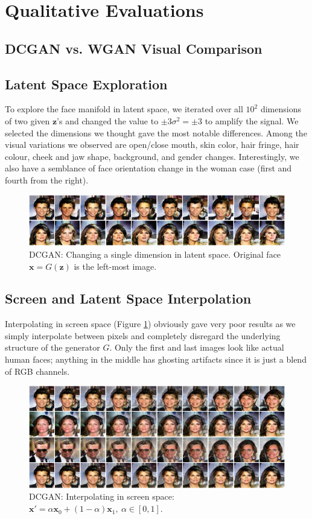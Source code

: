 \documentclass[table]{article}
\def\*#1{\mathbf{#1}}
\begin{document}
\newpage
\section{Qualitative Evaluations}
\subsection{DCGAN vs. WGAN Visual Comparison}


\subsection{Latent Space Exploration}
To explore the face manifold in latent space, we iterated over all $10^2$ dimensions of two given $\*z$'s and changed the value to $\pm 3\sigma^2 = \pm 3$ to amplify the signal. We selected the dimensions we thought gave the most notable differences. Among the visual variations we observed are open/close mouth, skin color, hair fringe, hair colour, cheek and jaw shape, background, and gender changes. Interestingly, we also have a semblance of face orientation change in the woman case (first and fourth from the right).
\begin{figure}[ht]
  \centering
  \includegraphics[width=\textwidth]{imgs/latent_explore}
  \caption{DCGAN: Changing a single dimension in latent space. Original face $\*x = G(\*z)$ is the left-most image.}
\end{figure}

\subsection{Screen and Latent Space Interpolation}
Interpolating in screen space (Figure \ref{screen_lerp}) obviously gave very poor results as we simply interpolate between pixels and completely disregard the underlying structure of the generator $G$. Only the first and last images look like actual human faces; anything in the middle has ghosting artifacts since it is just a blend of RGB channels.

\begin{figure}[ht]
  \centering
  \includegraphics[width=\textwidth]{imgs/gan_screen_lerp}
  \caption{DCGAN: Interpolating in screen space: $\*x' = \alpha \*x_0 + (1-\alpha)\*x_1, \ \alpha \in [0,1]$.}
  \label{screen_lerp}
\end{figure}
\end{document}
